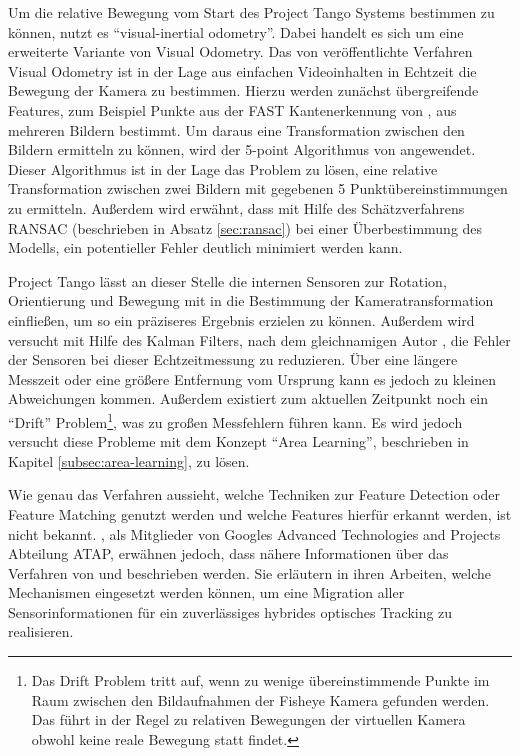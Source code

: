 Um die relative Bewegung vom Start des Project Tango Systems bestimmen zu können, nutzt es \enquote{visual-inertial odometry}. \citep{GoogleDevelopersConcepts:online}
Dabei handelt es sich um eine erweiterte Variante von Visual Odometry. 
Das von \citet{nister2004visual} veröffentlichte Verfahren Visual Odometry ist in der Lage aus einfachen Videoinhalten in Echtzeit die Bewegung der Kamera zu bestimmen. 
Hierzu werden zunächst übergreifende Features, zum Beispiel Punkte aus der FAST Kantenerkennung von \citet{trajkovic1998fast}, aus mehreren Bildern bestimmt. Um daraus eine Transformation zwischen den Bildern ermitteln zu können, wird der 5-point Algorithmus von \citet{nister2004efficient} angewendet. Dieser Algorithmus ist in der Lage das Problem zu lösen, eine relative Transformation zwischen zwei Bildern mit gegebenen 5 Punktübereinstimmungen zu ermitteln. Außerdem wird erwähnt, dass mit Hilfe des Schätzverfahrens RANSAC (beschrieben in Absatz \ref{sec:ransac}) bei einer Überbestimmung des Modells, ein potentieller Fehler deutlich minimiert werden kann. 

Project Tango lässt an dieser Stelle die internen Sensoren zur Rotation, Orientierung und Bewegung mit in die Bestimmung der Kameratransformation einfließen, um so ein präziseres Ergebnis erzielen zu können. Außerdem wird versucht mit Hilfe des Kalman Filters, nach dem gleichnamigen Autor \citet{kalman1960new}, die Fehler der Sensoren bei dieser Echtzeitmessung zu reduzieren. Über eine längere Messzeit oder eine größere Entfernung vom Ursprung kann es jedoch zu kleinen Abweichungen kommen. Außerdem existiert zum aktuellen Zeitpunkt noch ein \enquote{Drift} Problem\footnote{Das Drift Problem tritt auf, wenn zu wenige übereinstimmende Punkte im Raum zwischen den Bildaufnahmen der Fisheye Kamera gefunden werden. Das führt in der Regel zu relativen Bewegungen der virtuellen Kamera obwohl keine reale Bewegung statt findet.}, was zu großen Messfehlern führen kann. Es wird jedoch versucht diese Probleme mit dem Konzept \enquote{Area Learning}, beschrieben in Kapitel \ref{subsec:area-learning}, zu lösen. \citep{GoogleDevelopersConcepts:online}

Wie genau das Verfahren aussieht, welche Techniken zur Feature Detection oder Feature Matching genutzt werden und welche Features hierfür erkannt werden, ist nicht bekannt. \citet{Klingensmith_2015_7924}, als Mitglieder von Googles Advanced Technologies and Projects Abteilung ATAP, erwähnen jedoch, dass nähere Informationen über das Verfahren von \citet{kottas2013consistency} und \citet{mourikis2007multi} beschrieben werden. Sie erläutern in ihren Arbeiten, welche Mechanismen eingesetzt werden können, um eine Migration aller Sensorinformationen für ein zuverlässiges hybrides optisches Tracking zu realisieren.

